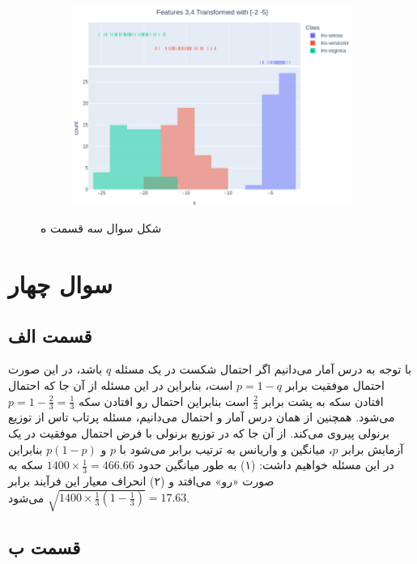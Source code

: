 \documentclass[14pt,a4]{article}
\begin{document}
\begin{figure}[h]
\begin{subfigure}{0.32\linewidth}
        \includegraphics[width=\linewidth]{images/q3/p5/34T3.png}
    \end{subfigure}
    \caption{شکل سوال سه قسمت ه}
    \label{image-for-question1-part5}
\end{figure}

\section*{سوال چهار}

\subsection*{قسمت الف}

با توجه به درس آمار می‌دانیم اگر احتمال شکست در یک مسئله $q$ باشد، در این صورت احتمال موفقیت برابر $p=1-q$ است،
بنابراین در این مسئله از آن جا که احتمال افتادن سکه به پشت برابر $\frac{2}{3}$ است بنابراین احتمال رو افتادن سکه
$p=1 - \frac{2}{3} = \frac{1}{3}$ می‌شود. همچنین از همان درس آمار و احتمال می‌دانیم، مسئله‌ پرتاب تاس از توزیع برنولی پیروی می‌کند. از آن جا که در توزیع برنولی
با فرض  احتمال موفقیت در یک آزمایش برابر $p$، میانگین و واریانس به ترتیب برابر می‌شود با $p$ و $p(1-p)$ بنابراین در این
مسئله خواهیم داشت:‌ (۱) به طور میانگین حدود $1400\times \frac{1}{3} = 466.66$ سکه به صورت «رو»‌ می‌افتد
و (۲) انحراف معیار این فرآیند برابر $\sqrt{1400 \times \frac{1}{3}(1-\frac{1}{3})} = 17.63$ می‌شود.

\subsection*{قسمت ب}
\end{document}
